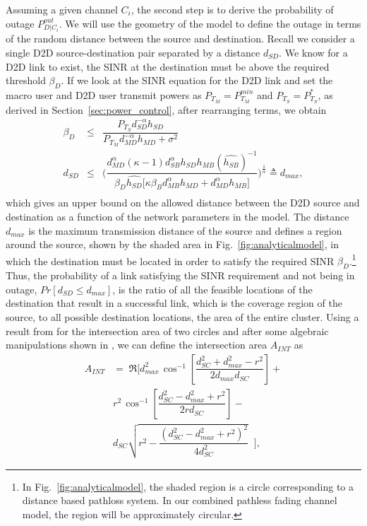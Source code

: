 \documentclass[10pt, final, journal, letterpaper,oneside, twocolumn]{IEEEtran}
\begin{document}
Assuming a given channel $C_i$, the second step is to derive the probability of outage $P^{out}_{D|C_{i}}$.  We will use the geometry of the model to define the outage in terms of the random distance between the source and destination.  Recall we consider a single D2D source-destination pair separated by a distance $d_{SD}$.  We know for a D2D link to exist, the SINR at the destination must be above the required threshold $\beta_{D}$.  If we look at the SINR equation for the D2D link and set the macro user and D2D user transmit powers as $P_{T_M} = P_{T_M}^{min}$ and $P_{T_S}=P_{T_S}^*$, as derived in Section~\ref{sec:power_control}, after rearranging terms, we obtain 
\begin{eqnarray} 
\beta_{D} \!\!\!\!&\leq& \!\!\!\dfrac{P_{T_{S}}d_{SD}^{-\alpha}h_{SD}}{P_{T_{M}}d_{MD}^{-\alpha}h_{MD}+\sigma^2} \nonumber
\\
d_{SD} \!\!\!\!&\leq&\!\!\!\!\! \Bigg( \dfrac{d_{MD}^{\alpha}(\kappa -1)d_{SB}^{\alpha}h_{SD}h_{MB}(\widehat{h_{SB}})^{-1}}{\beta_D\widehat{h_{SD}}\big[\kappa \beta_{B} d_{MB}^{\alpha}h_{MD} + d_{MD}^{\alpha}h_{MB}\big]}   \Bigg)^{\frac{1}{\alpha}} \!\triangleq d_{max}, \nonumber
\\
\label{eq:d}
\end{eqnarray}
which gives an upper bound on the allowed distance between the D2D source and destination as a function of the network parameters in the model.  The distance $d_{max}$ is the maximum transmission distance of the source and defines a region around the source, shown by the shaded area in Fig.~\ref{fig:analyticalmodel}, in which the destination must be located in order to satisfy the required SINR $\beta_D$.\footnote{In Fig.~\ref{fig:analyticalmodel}, the shaded region is a circle corresponding to a distance based pathloss system.  In our combined pathless fading channel model, the region will be approximately circular.}  Thus, the probability of a link satisfying the SINR requirement and not being in outage, $Pr[d_{SD} \leq d_{max}]$, is the ratio of all the feasible locations of the destination that result in a successful link, which is the coverage region of the source, to all possible destination locations, the area of the entire cluster.  Using a result from \cite{geometry_prob} for the intersection area of two circles and after some algebraic manipulations shown in \cite{bkaufman_t1}, we can define the intersection area $A_{INT}$ as
\begin{eqnarray} 
A_{INT}\!\!\!&= \;\Re\Bigg[d_{max}^2\, \cos^{-1}\left[\dfrac{d_{SC}^2 + d_{max}^2 - r^2}{2 d_{max}d_{SC}}\right] +\nonumber
\\
& {}
r^2\, \cos^{-1}\left[\dfrac{d_{SC}^2 - d_{max}^2 + r^2}{2 rd_{SC}}\right] - \nonumber 
\\
&  {}
d_{SC}\sqrt{r^2-\dfrac{(d_{SC}^2-d_{max}^2+r^2)^2}{4d_{SC}^2}}\; \; \Bigg], 
\label{eq:m3_tx_area}
\end{eqnarray}
\end{document}
